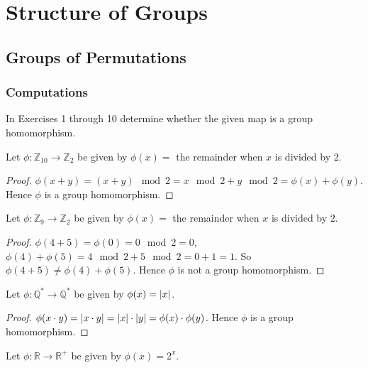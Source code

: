 \chapter{Structure of Groups}

\section{Groups of Permutations}

\subsection*{Computations}

In Exercises 1 through 10 determine whether the given map is a group homomorphism.

\begin{exercise}
    Let $\phi: \mathbb{Z}_{10} \to \mathbb{Z}_{2}$ be given by $\phi(x) = $ the remainder when $x$ is divided by $2$.
\end{exercise}

\begin{proof}
    $\phi(x + y) = (x + y) \mod 2 = x \mod 2 + y \mod 2 = \phi(x) + \phi(y)$. Hence $\phi$ is a group homomorphism.
\end{proof}

\begin{exercise}
    Let $\phi: \mathbb{Z}_{9} \to \mathbb{Z}_{2}$ be given by $\phi(x) =$ the remainder when $x$ is divided by $2$.
\end{exercise}

\begin{proof}
    $\phi(4 + 5) = \phi(0) = 0\mod 2 = 0$, $\phi(4) + \phi(5) = 4\mod 2 + 5\mod 2 = 0 + 1 = 1$. So $\phi(4 + 5) \ne \phi(4) + \phi(5)$. Hence $\phi$ is not a group homomorphism.
\end{proof}

\begin{exercise}
    Let $\phi: \mathbb{Q}^{*} \to \mathbb{Q}^{*}$ be given by $\phi(x) = \left\vert{x}\right\vert$.
\end{exercise}

\begin{proof}
    $\phi(x\cdot y) = \left\vert{x\cdot y}\right\vert = \left\vert{x}\right\vert\cdot\left\vert{y}\right\vert = \phi(x)\cdot\phi(y)$. Hence $\phi$ is a group homomorphism.
\end{proof}

\begin{exercise}
    Let $\phi: \mathbb{R} \to \mathbb{R}^{+}$ be given by $\phi(x) = 2^{x}$.
\end{exercise}

